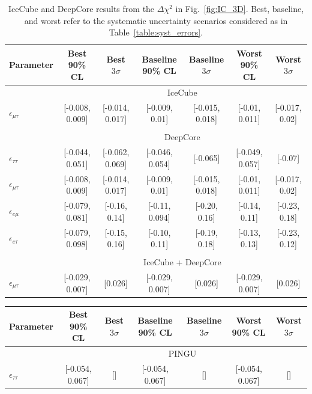 \documentclass[draft=True]{revtex4-2}
\newcommand{\emt}{\ensuremath{\epsilon_{\mu\tau}}}
\newcommand{\eet}{\epsilon_{e\tau}}
\newcommand{\eem}{\epsilon_{e\mu}}
\newcommand{\ett}{\ensuremath{\epsilon_{\tau\tau}}}
\begin{document}
{{\renewcommand{\arraystretch}{1.3}
 \begin{table}
   \begin{center}
   \begin{tabular}{lcccccc}
      \hline \hline
      Parameter & Best 90\% CL & Best $3\sigma$& Baseline 90\% CL & Baseline $3\sigma$ & Worst 90\% CL & Worst $3\sigma$\\
      \hline & \multicolumn{6}{c}{IceCube}  \\
      $\emt$ &  [-0.008, 0.009] &  [-0.014, 0.017] &   [-0.009, 0.01] &  [-0.015, 0.018] &   [-0.01, 0.011] &   [-0.017, 0.02] \\\\
      & \multicolumn{6}{c}{DeepCore}\\ [0.3em]
      $\ett$ &  [-0.044, 0.051] &  [-0.062, 0.069] &  [-0.046, 0.054] &         [-0.065] &  [-0.049, 0.057] &          [-0.07] \\
      $\emt$ &  [-0.008, 0.009] &  [-0.014, 0.017] &   [-0.009, 0.01] &  [-0.015, 0.018] &   [-0.01, 0.011] &   [-0.017, 0.02] \\
      $\eem$ &  [-0.079, 0.081] &   [-0.16, 0.14] &  [-0.11, 0.094] &  [-0.20, 0.16] &   [-0.14, 0.11] &   [-0.23, 0.18] \\
      $\eet$ &  [-0.079, 0.098] &  [-0.15, 0.16] &   [-0.10, 0.11] &  [-0.19, 0.18] &  [-0.13, 0.13] &  [-0.23, 0.12] \\\\
      &\multicolumn{6}{c}{IceCube + DeepCore}\\
      $\emt$ &  [-0.029, 0.007] &          [0.026] &  [-0.029, 0.007] &          [0.026] &  [-0.029, 0.007] &          [0.026] \\
      \hline
      \hline
   \end{tabular}
   \end{center}
   \caption{IceCube and DeepCore results from the $\Delta \chi^2$ in Fig.~\ref{fig:IC_3D}. Best, baseline, and worst refer to 
   the systematic uncertainty scenarios considered as in Table~\ref{table:syst_errors}.}\label{table:IC_DC_results}
\end{table}
\begin{table}
   \begin{tabular}{lcccccc}
      \hline \hline
      Parameter & Best 90\% CL & Best $3\sigma$& Baseline 90\% CL & Baseline $3\sigma$ & Worst 90\% CL & Worst $3\sigma$\\
      \hline & \multicolumn{6}{c}{PINGU} \\
      $\ett$ &  [-0.054, 0.067] &               [] &  [-0.054, 0.067] &               [] &  [-0.054, 0.067] &               [] \\

\end{tabular}
\end{table}}}
\end{document}
